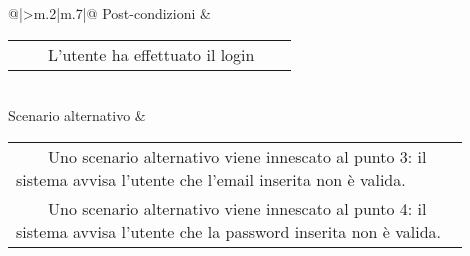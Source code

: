 \begin{longtable}{@{}|>{\centering\arraybackslash}m{.2\textwidth}|m{.7\textwidth}|@{}}
		Post-condizioni & \begin{tabular}{m{0.9\linewidth}}~~\llap{\textbullet}~~L'utente ha effettuato il login\\\end{tabular}\\
		Scenario alternativo & \begin{tabular}{m{0.9\linewidth}}~~\llap{\textbullet}~~Uno scenario alternativo viene innescato al punto 3: il sistema avvisa l'utente che l'email inserita non è valida.\\~~\llap{\textbullet}~~Uno scenario alternativo viene innescato al punto 4: il sistema avvisa l'utente che la password inserita non è valida.\\\end{tabular}\\\hline
		
	\end{longtable}

